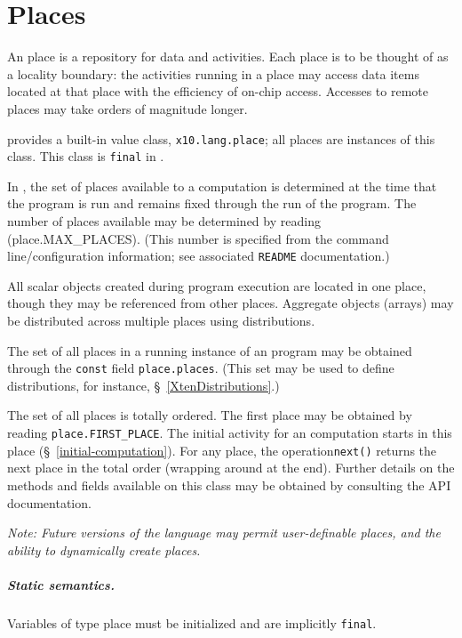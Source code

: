 \chapter{Places}\label{XtenPlaces}
\cbstart 
An \Xten{} place is a repository for data and activities. Each place
is to be thought of as a locality boundary: the activities running in
a place may access data items located at that place with the
efficiency of on-chip access. Accesses to remote places may take
orders of magnitude longer.

{}\Xten{} provides a built-in value class, {\tt x10.lang.place}; all
places are instances of this class.  This class is {\tt final} in
{}\XtenCurrVer.

In \XtenCurrVer{}, the set of places available to a computation is
determined at the time that the program is run and remains fixed
through the run of the program. The number of places available 
may be determined by reading ({\cf place.MAX\_PLACES}). (This number
is specified from the command line/configuration information; 
see associated {\tt README} documentation.)

All scalar objects created during program execution are located in one
place, though they may be referenced from other places. Aggregate
objects (arrays) may be distributed across multiple places using
distributions.

The set of all places in a running instance of an \Xten{} program may
be obtained through the {\tt const} field {\tt place.places}.  (This
set may be used to define distributions, for instance,
\S~\ref{XtenDistributions}.) 


The set of all places is totally ordered.  The first place may be
obtained by reading {\tt place.FIRST\_PLACE}. The initial activity for
an \Xten{} computation starts in this place
(\S~\ref{initial-computation}). For any place, the operation{\tt next()}
returns the next place in the total order (wrapping around at the
end). Further details on the methods and fields available on this
class may be obtained by consulting the API documentation.

{\em Note: Future versions of the language may permit user-definable
places, and the ability to dynamically create places. }

\paragraph{Static semantics.}
Variables of type {\cf place} must be initialized and are implicitly
{\tt final}.  

